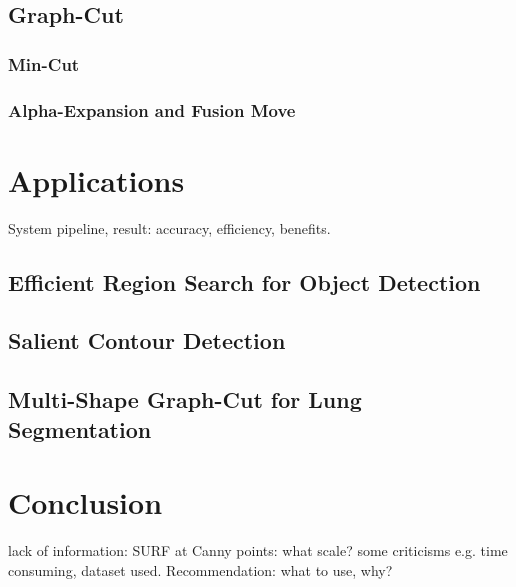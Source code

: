 \documentclass{SMBV12}
\begin{document}
\subsection{Graph-Cut}
\label{sec:graph_cut}
\subsubsection{Min-Cut}

\subsubsection{Alpha-Expansion and Fusion Move}

\section{Applications}

System pipeline, result: accuracy, efficiency, benefits.

\subsection{Efficient Region Search for Object Detection}

\cite{VijayGrauman2011}

\subsection{Salient Contour Detection}

\cite{KenGalShi2011}

\subsection{Multi-Shape Graph-Cut for Lung Segmentation}

\cite{nakagomimulti}

\section{Conclusion}

lack of information: SURF at Canny points: what scale?
some criticisms e.g. time consuming, dataset used. Recommendation: what to use, why?

%
\def\refname{Literature}





\end{document}
